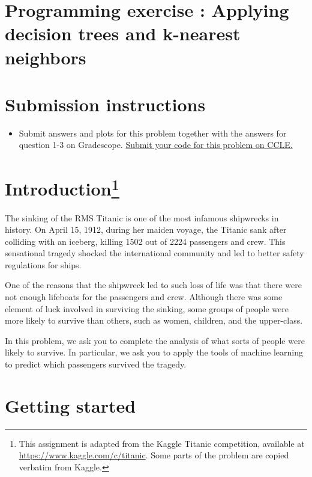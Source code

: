 

\section{Programming exercise : Applying decision trees and k-nearest neighbors }

\section*{Submission instructions}
\begin{itemize}
\item {\large Submit answers and plots for this problem together with the answers for question 1-3 on Gradescope. 
	\ul{Submit your code for this problem on CCLE.}}
\end{itemize}


\section*{Introduction\footnote{This assignment is adapted from the Kaggle Titanic competition, available at \url{https://www.kaggle.com/c/titanic}. Some parts of the problem are copied verbatim from Kaggle.}}

The sinking of the RMS Titanic is one of the most infamous shipwrecks in history.  On April 15, 1912, during her maiden voyage, the Titanic sank after colliding with an iceberg, killing 1502 out of 2224 passengers and crew. This sensational tragedy shocked the international community and led to better safety regulations for ships.

One of the reasons that the shipwreck led to such loss of life was that there were not enough lifeboats for the passengers and crew. Although there was some element of luck involved in surviving the sinking, some groups of people were more likely to survive than others, such as women, children, and the upper-class.

In this problem, we ask you to complete the analysis of what sorts of people were likely to survive. In particular, we ask you to apply the tools of machine learning to predict which passengers survived the tragedy.


\section*{Getting started}

